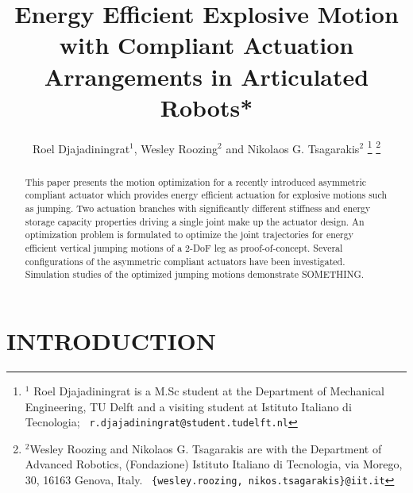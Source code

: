 \documentclass[letterpaper, 10 pt, conference]{ieeeconf}  %
\title{\LARGE \bf
Energy Efficient Explosive Motion with Compliant Actuation Arrangements in Articulated Robots*
}
\author{Roel Djajadiningrat$^{1}$, Wesley Roozing$^{2}$ and Nikolaos G. Tsagarakis$^{2}$%
\thanks{$^{1}$ Roel Djajadiningrat is a M.Sc student at the Department of Mechanical Engineering, TU Delft and a visiting student at Istituto Italiano di Tecnologia;
        {\tt\ r.djajadiningrat@student.tudelft.nl}
  }%
\thanks{$^{2}$Wesley Roozing and Nikolaos G. Tsagarakis are with the Department of Advanced Robotics,
	(Fondazione) Istituto Italiano di Tecnologia, via Morego,
	30, 16163 Genova, Italy.
        {\tt\ \{wesley.roozing, nikos.tsagarakis\}@iit.it}
     }%
}
\begin{document}
\maketitle
\thispagestyle{empty}
\pagestyle{empty}


\begin{abstract}

This paper presents the motion optimization for a recently introduced asymmetric compliant actuator which provides energy efficient actuation for explosive motions such as jumping. Two actuation branches
with significantly different stiffness and energy storage capacity properties driving a single joint make up the actuator design. An optimization problem is formulated to optimize the joint trajectories for energy efficient vertical jumping motions of a 2-DoF leg as proof-of-concept. Several configurations of the asymmetric compliant actuators have been investigated. Simulation studies of the optimized jumping motions demonstrate SOMETHING. 

\end{abstract}


\section{INTRODUCTION}
\end{document}
